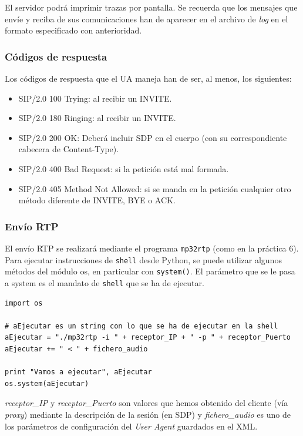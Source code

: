 \documentclass[a4paper,11pt]{article}
\begin{document}
El servidor podrá imprimir trazas por pantalla. Se recuerda que 
los mensajes que envíe y reciba de sus comunicaciones han de aparecer
en el archivo de \emph{log} en el formato especificado con anterioridad.

\subsubsection{Códigos de respuesta}

Los códigos de respuesta que el UA maneja han de ser, al menos, los siguientes:

   \begin{itemize}
     \item SIP/2.0 100 Trying: al recibir un INVITE.
     \item SIP/2.0 180 Ringing: al recibir un INVITE.
     \item SIP/2.0 200 OK: Deberá incluir SDP en el cuerpo (con su correspondiente cabecera de Content-Type).
     \item SIP/2.0 400 Bad Request: si la petición está mal formada.
     \item SIP/2.0 405 Method Not Allowed: si se manda en la petición cualquier otro método diferente de INVITE, BYE o ACK.
   \end{itemize}

\subsubsection{Envío RTP}

El envío RTP se realizará mediante el programa \texttt{mp32rtp} (como en la práctica 6). 
Para ejecutar instrucciones de \texttt{shell} desde Python, se puede utilizar algunos métodos del módulo os, en particular con \texttt{system()}. El parámetro que se le pasa a system es
el mandato de \texttt{shell} que se ha de ejecutar.

\begin{verbatim}
import os

# aEjecutar es un string con lo que se ha de ejecutar en la shell
aEjecutar = "./mp32rtp -i " + receptor_IP + " -p " + receptor_Puerto 
aEjecutar += " < " + fichero_audio

print "Vamos a ejecutar", aEjecutar
os.system(aEjecutar)
\end{verbatim}

\emph{receptor\_IP} y \emph{receptor\_Puerto} son valores que hemos obtenido del cliente (vía \emph{proxy}) mediante la descripción de la sesión (en SDP) y \emph{fichero\_audio} es uno de los parámetros de configuración del \emph{User Agent} guardados en el XML.
\end{document}
